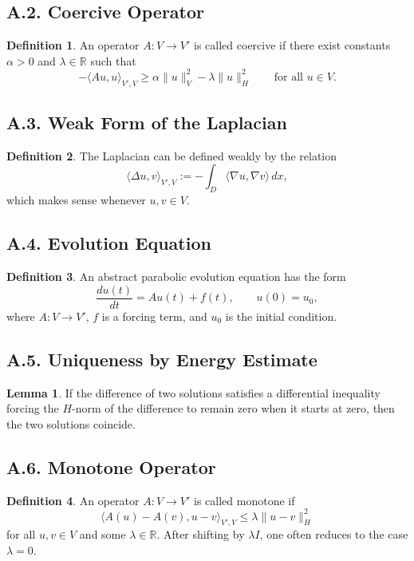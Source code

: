 \documentclass[11pt]{article}
\theoremstyle{definition}
\newtheorem{definition}{Definition}
\newtheorem{lemma}{Lemma}
\theoremstyle{remark}
\begin{document}
\subsection*{A.2. Coercive Operator}
\begin{definition}
An operator \(A:V\to V'\) is called coercive if there exist constants \(\alpha>0\) and \(\lambda\in\mathbb R\) such that
\[
-\langle Au,u\rangle_{V',V}\ge \alpha\|u\|_V^2-\lambda\|u\|_H^2
\qquad
\text{for all } u\in V.
\]
\end{definition}

\subsection*{A.3. Weak Form of the Laplacian}
\begin{definition}
The Laplacian can be defined weakly by the relation
\[
\langle \Delta u,v\rangle_{V',V}
:=
-\int_D \langle \nabla u,\nabla v\rangle\,dx,
\]
which makes sense whenever \(u,v\in V\).
\end{definition}

\subsection*{A.4. Evolution Equation}
\begin{definition}
An abstract parabolic evolution equation has the form
\[
\frac{du(t)}{dt}=Au(t)+f(t),
\qquad
u(0)=u_0,
\]
where \(A:V\to V'\), \(f\) is a forcing term, and \(u_0\) is the initial condition.
\end{definition}

\subsection*{A.5. Uniqueness by Energy Estimate}
\begin{lemma}
If the difference of two solutions satisfies a differential inequality forcing the \(H\)-norm of the difference to remain zero when it starts at zero, then the two solutions coincide.
\end{lemma}

\subsection*{A.6. Monotone Operator}
\begin{definition}
An operator \(A:V\to V'\) is called monotone if
\[
\langle A(u)-A(v),u-v\rangle_{V',V}\le \lambda\|u-v\|_H^2
\]
for all \(u,v\in V\) and some \(\lambda\in\mathbb R\). After shifting by \(\lambda I\), one often reduces to the case \(\lambda=0\).
\end{definition}
\end{document}
